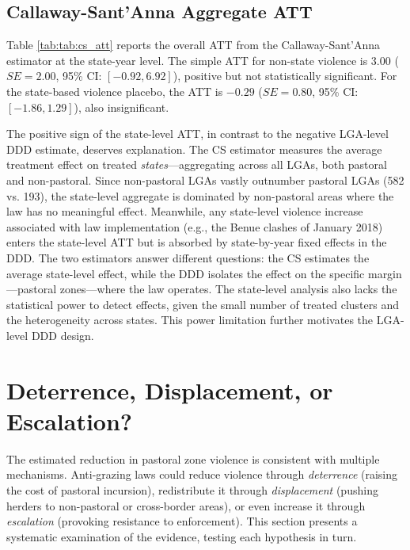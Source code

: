 \documentclass[12pt]{article}
\begin{document}
\subsection{Callaway-Sant'Anna Aggregate ATT}

Table \ref{tab:tab:cs_att} reports the overall ATT from the Callaway-Sant'Anna estimator at the state-year level. The simple ATT for non-state violence is 3.00 ($SE = 2.00$, 95\% CI: $[-0.92, 6.92]$), positive but not statistically significant. For the state-based violence placebo, the ATT is $-0.29$ ($SE = 0.80$, 95\% CI: $[-1.86, 1.29]$), also insignificant.

The positive sign of the state-level ATT, in contrast to the negative LGA-level DDD estimate, deserves explanation. The CS estimator measures the average treatment effect on treated \textit{states}---aggregating across all LGAs, both pastoral and non-pastoral. Since non-pastoral LGAs vastly outnumber pastoral LGAs (582 vs. 193), the state-level aggregate is dominated by non-pastoral areas where the law has no meaningful effect. Meanwhile, any state-level violence increase associated with law implementation (e.g., the Benue clashes of January 2018) enters the state-level ATT but is absorbed by state-by-year fixed effects in the DDD. The two estimators answer different questions: the CS estimates the average state-level effect, while the DDD isolates the effect on the specific margin---pastoral zones---where the law operates. The state-level analysis also lacks the statistical power to detect effects, given the small number of treated clusters and the heterogeneity across states. This power limitation further motivates the LGA-level DDD design.




\section{Deterrence, Displacement, or Escalation?}

The estimated reduction in pastoral zone violence is consistent with multiple mechanisms. Anti-grazing laws could reduce violence through \textit{deterrence} (raising the cost of pastoral incursion), redistribute it through \textit{displacement} (pushing herders to non-pastoral or cross-border areas), or even increase it through \textit{escalation} (provoking resistance to enforcement). This section presents a systematic examination of the evidence, testing each hypothesis in turn.
\end{document}
